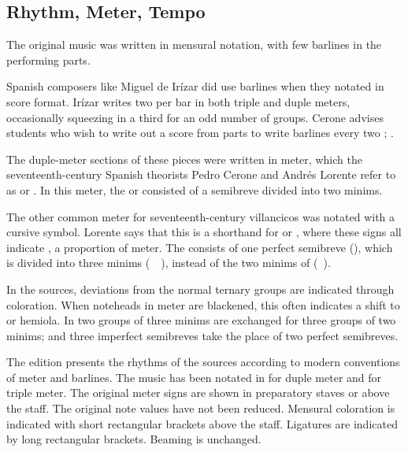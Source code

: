 \subsection{Rhythm, Meter, Tempo}
The original music was written in mensural notation, with few barlines in the 
performing parts.%
\begin{Footnote}
    Spanish composers like Miguel de Irízar did use barlines when they notated in 
    score format.
    Irízar writes two  per bar in both triple and duple meters,
    occasionally squeezing in a third  for an odd number
    of groups.
    Cerone advises students who wish to write out a score from parts to write 
    barlines every two ; \textcite[745]{Cerone:Melopeo}.
\end{Footnote}
The duple-meter sections of these pieces were written in \meterC{} meter, which
the seventeenth-century Spanish theorists Pedro Cerone and Andrés Lorente refer
to as  or .%
  \Autocites
  [537]{Cerone:Melopeo}
  [156, 210]{Lorente:Porque}
In this meter, the  or  consisted of a semibreve 
divided into two minims.%
  \Autocites
  {GonzalezValle:MusicaTexto}
  {GonzalezValle:CompasCabezon}

The other common meter for seventeenth-century villancicos was notated with
a cursive \meterCZ{} symbol.
Lorente says that this is a shorthand for \meterCThreeTwo{} or \meterCThree{},
where these signs all indicate , a 
proportion of \meterC{} meter.%
  \autocite[165]{Lorente:Porque}
The  consists of one perfect semibreve (\musSemibreveDotted), which
is divided into three minims (\musMinim\ \musMinim\ \musMinim), instead of the
two minims of \meterC{} (\musMinim\ \musMinim).

In the sources, deviations from the normal ternary groups are indicated through 
coloration. 
When noteheads in \meterCThree{} meter are blackened, this often indicates a
shift to  or hemiola.
In  two groups of three minims are exchanged for three 
groups of two minims; and three imperfect semibreves take the place of two
perfect semibreves.

The edition presents the rhythms of the sources according to modern conventions 
of meter and barlines.
The music has been notated in \meterC{} for duple meter and \meterCThree{}
for triple meter.
The original meter signs are shown in preparatory staves or above the staff.
The original note values have not been reduced.
Mensural coloration is indicated with short rectangular brackets above the 
staff.
Ligatures are indicated by long rectangular brackets.
Beaming is unchanged.

